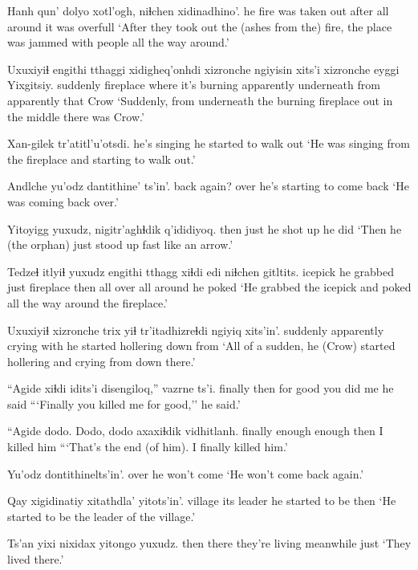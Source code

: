 \documentclass[12pt]{article}
\begin{document}
\gll Hanh qun' dolyo     xotl'ogh, niɬchen  xidinadhino'.
he   fire {was taken out} after    {all around} {it was overfull}
\glt `After they took out the (ashes from the) fire, the place was jammed with people all the way around.'
\glend

\gll Uxuxiyiɬ {engithi tthaggi} xidigheq'onhdi xizronche  ngiyisin   xits'i xizronche eyggi Yixgitsiy.
suddenly fireplace          {where it's burning}   apparently underneath from   apparently  that  Crow
\glt `Suddenly, from underneath the burning fireplace out in the middle there was Crow.'
\glend

\gll Xan-gilek    tr'atitl'u'otsdi.
{he's singing} {he started to walk out}
\glt `He was singing from the fireplace and starting to walk out.'
\glend

\gll Andlche    yu'odz {dantithine' ts'in'.  }
{back again?} over   {he's starting to come back}
\glt `He was coming back over.'
\glend

\gll Yitoyigg yuxudz, nigitr'aghɬdik q'ididiyoq.
then     just   {he shot up} {he did}
\glt `Then he (the orphan) just stood up fast like an arrow.'
\glend

\gll Tedzeɬ  itlyiɬ     yuxudz {engithi tthagg} xiɬdi edi      niɬchen    gitltits.
icepick {he grabbed} just   fireplace      then {all over} {all around} {he poked}
\glt `He grabbed the icepick and poked all the way around the fireplace.'
\glend

\gll Uxuxiyiɬ xizronche  trix   yiɬ  tr'itadhizreɬdi        ngiyiq xits'in'.
suddenly apparently crying with {he started hollering} down   from
\glt `All of a sudden, he (Crow) started hollering and crying from down there.'
\glend

\gll ``Agide   xiɬdi idits'i disengiloq,'' vazrne  ts'i.
finally then  {for good} {you did me} {he said}
\glt ```Finally you killed me for good,'' he said.'
\glend

\gll ``Agide dodo.    Dodo, dodo   axaxiɬdik vidhitlanh.
finally enough enough {} then    {I killed him}
\glt ```That's the end (of him). I finally killed him.'
\glend

\gll Yu'odz {dontithinelts'in'.}
over   {he won't come}
\glt `He won't come back again.'
\glend

\gll Qay     xigidinatiy xitathdla' yitots'in'.
village {its leader} {he started to be} then
\glt `He started to be the leader of the village.'
\glend

\gll Ts'an yixi nixidax yitongo yuxudz.
then   there {they're living}  meanwhile just
\glt `They lived there.'
\glend
\end{document}
